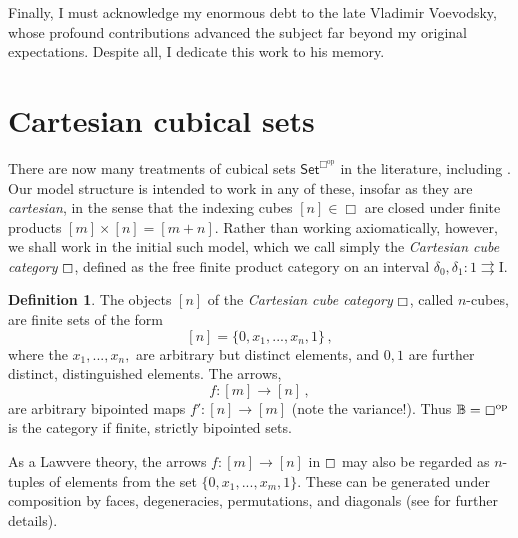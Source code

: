 \documentclass[11pt]{amsart}
\newcommand{\C}{\ensuremath{\boxempty}}
\newcommand{\B}{\ensuremath{\mathbb{B}}}
\newcommand{\T}{\ensuremath{\mathbb{T}}}
\newcommand{\Set}{\ensuremath{\mathsf{Set}}}
\newcommand{\op}[1]{\ensuremath{{#1}^{\mathrm{op}}}}
\newcommand{\ra}{\ensuremath{\rightarrow}}
\newcommand{\I}{\ensuremath{\mathrm{I}}}
\theoremstyle{remark}
\theoremstyle{definition}
\newtheorem{definition}[theorem]{Definition}
\begin{document}
Finally, I must acknowledge my enormous debt to the late Vladimir Voevodsky, whose profound contributions advanced the subject far beyond my original expectations. Despite all, I dedicate this work to his memory.

%
\section{Cartesian cubical sets}

There are now many treatments of cubical sets $\Set^{\op{\Box}}$ in the literature, including \cite{Grandis, Grandis, Jardine, Jardine, Bezem, OrtonPitts, Coquand, Cisinski}.  Our model structure is intended to work in any of these, insofar as they are  \emph{cartesian}, in the sense that the indexing cubes $[n]\in\Box$ are closed under finite products $[m]\times[n] = [m+n]$.   
Rather than working axiomatically, however, we shall work in the initial such model, which we call simply the \emph{Cartesian cube category} $\C$, defined as the free finite product category on an interval $\delta_0, \delta_1 : 1\rightrightarrows \I$.

\begin{definition}
The objects $[n]$ of the \emph{Cartesian cube category} $\C$, called $n$-cubes, are finite sets of the form $$[n] = \{0, x_1, ..., x_n, 1\}\,,$$  where the $x_1, ..., x_n,$ are arbitrary but distinct elements, and $0,1$ are further distinct, distinguished elements.
The arrows,
\[
f : [m] \ra [n]\,,
\]
are arbitrary bipointed maps $f' : [n]\ra [m]$ (note the variance!).  Thus $\B = \op\C$ is the category if finite, strictly bipointed sets.  
\end{definition}
As a Lawvere theory, the arrows $f : [m] \ra [n]$ in $\C$ may also be regarded as $n$-tuples of elements from the set $\{0, x_1, ..., x_m, 1\}$.   These can be generated under composition by faces, degeneracies, permutations, and diagonals (see \cite{parker:thesis} for further details).
\end{document}
